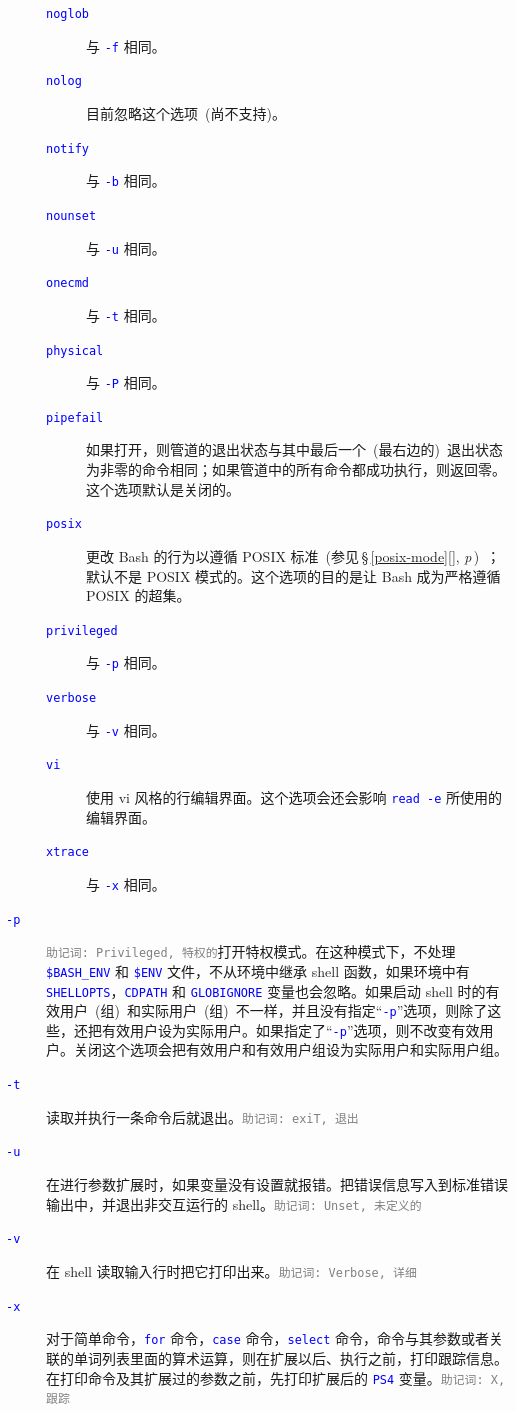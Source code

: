 \documentclass[openany,notitlepage]{book}
\newcommand{\mnemonic}[1]{\textcolor{gray}{{\scriptsize\tt 助记词: #1}}}
\newcommand{\code}[1]{\textcolor{blue}{{\tt #1}}}
\newcommand{\fullref}[1]{\,\S\,\ref{#1}[\nameref{#1}], \textit{p\pageref{#1}}\,}
\begin{document}
\begin{CJK}{UTF8}{song}
\begin{description}
\begin{description}
        \item[\code{noglob}] 与 \code{-f} 相同。
        \item[\code{nolog}] 目前忽略这个选项~(尚不支持)。
        \item[\code{notify}] 与 \code{-b} 相同。
        \item[\code{nounset}] 与 \code{-u} 相同。
        \item[\code{onecmd}] 与 \code{-t} 相同。
        \item[\code{physical}] 与 \code{-P} 相同。
        \item[\code{pipefail}\label{shopt:pipefail}] 如果打开，则管道的退出状态与其中最后一个~(最右边的)~退出状态为非零的命令相同；如果管道中的所有命令都成功执行，则返回零。这个选项默认是关闭的。
        \item[\code{posix}] 更改 Bash 的行为以遵循 POSIX 标准~(参见\fullref{posix-mode})~；默认不是 POSIX 模式的。这个选项的目的是让 Bash 成为严格遵循 POSIX 的超集。
        \item[\code{privileged}] 与 \code{-p} 相同。
        \item[\code{verbose}] 与 \code{-v} 相同。
        \item[\code{vi}]\label{set:vi} 使用 vi 风格的行编辑界面。这个选项会还会影响 \code{read -e} 所使用的编辑界面。
        \item[\code{xtrace}]\label{set:xtrace} 与 \code{-x} 相同。
    \end{description}
    \item[\code{-p}] \mnemonic{Privileged, 特权的}打开特权模式。在这种模式下，不处理 \code{\$BASH\_ENV} 和 \code{\$ENV} 文件，不从环境中继承 shell 函数，如果环境中有 \code{SHELLOPTS}，\code{CDPATH} 和 \code{GLOBIGNORE} 变量也会忽略。如果启动 shell 时的有效用户~(组)~和实际用户~(组)~不一样，并且没有指定``\code{-p}''选项，则除了这些，还把有效用户设为实际用户。如果指定了``\code{-p}''选项，则不改变有效用户。关闭这个选项会把有效用户和有效用户组设为实际用户和实际用户组。
    \item[\code{-t}] 读取并执行一条命令后就退出。\mnemonic{exiT, 退出}
    \item[\code{-u}]\label{set:u} 在进行参数扩展时，如果变量没有设置就报错。把错误信息写入到标准错误输出中，并退出非交互运行的 shell。\mnemonic{Unset, 未定义的}
    \item[\code{-v}] 在 shell 读取输入行时把它打印出来。\mnemonic{Verbose, 详细}
    \item[\code{-x}]\label{set:x} 对于简单命令，\code{for} 命令，\code{case} 命令，\code{select} 命令，命令与其参数或者关联的单词列表里面的算术运算，则在扩展以后、执行之前，打印跟踪信息。在打印命令及其扩展过的参数之前，先打印扩展后的 \code{PS4} 变量。\mnemonic{X, 跟踪}

\end{description}
\end{CJK}
\end{document}

